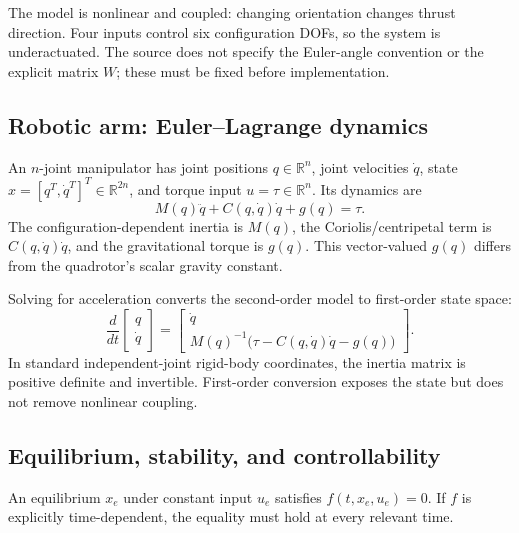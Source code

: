\documentclass[11pt,a4paper]{article}
\numberwithin{equation}{section}
\numberwithin{figure}{section}
\numberwithin{table}{section}
\newcommand{\R}{\mathbb{R}}
\begin{document}
The model is nonlinear and coupled: changing orientation changes thrust direction. Four inputs control six configuration DOFs, so the system is underactuated. The source does not specify the Euler-angle convention or the explicit matrix $W$; these must be fixed before implementation.

\subsection{Robotic arm: Euler--Lagrange dynamics}
An $n$-joint manipulator has joint positions $q\in\R^n$, joint velocities $\dot q$, state $x=[q^T,\dot q^T]^T\in\R^{2n}$, and torque input $u=\tau\in\R^n$. Its dynamics are
\begin{equation}\label{eq:arm}M(q)\ddot q+C(q,\dot q)\dot q+g(q)=\tau.\end{equation}
The configuration-dependent inertia is $M(q)$, the Coriolis/centripetal term is $C(q,\dot q)\dot q$, and the gravitational torque is $g(q)$. This vector-valued $g(q)$ differs from the quadrotor's scalar gravity constant.

Solving for acceleration converts the second-order model to first-order state space:
\begin{equation}
\frac{d}{dt}\begin{bmatrix}q\\\dot q\end{bmatrix}
=\begin{bmatrix}\dot q\\M(q)^{-1}\bigl(\tau-C(q,\dot q)\dot q-g(q)\bigr)\end{bmatrix}.
\end{equation}
In standard independent-joint rigid-body coordinates, the inertia matrix is positive definite and invertible. First-order conversion exposes the state but does not remove nonlinear coupling.

\subsection{Equilibrium, stability, and controllability}
An equilibrium $x_e$ under constant input $u_e$ satisfies $f(t,x_e,u_e)=0$. If $f$ is explicitly time-dependent, the equality must hold at every relevant time.
\end{document}
